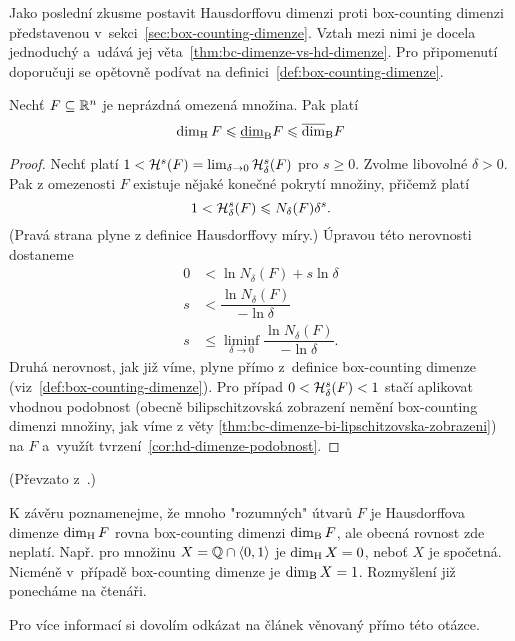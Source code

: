 Jako poslední zkusme postavit Hausdorffovu dimenzi proti box-counting dimenzi představenou v~sekci~\ref{sec:box-counting-dimenze}. Vztah mezi nimi je docela jednoduchý a~udává jej věta~\ref{thm:bc-dimenze-vs-hd-dimenze}. Pro připomenutí doporučuji se opětovně podívat na definici~\ref{def:box-counting-dimenze}.
\begin{theorem}\label{thm:bc-dimenze-vs-hd-dimenze}
    Nechť $F\subseteq\mathbb{R}^n$ je neprázdná omezená množina. Pak platí
    \[\operatorname{dim_H}{F}\leqslant\underline{\dim}_\textup{B}{F}\leqslant\overline{\dim}_\textup{B}{F}\]
\end{theorem}
\begin{proof}
    Nechť platí $1<\mathcal{H}^{s}(F)=\lim_{\delta\to 0}\mathcal{H}_{\delta}^{s}(F)$ pro $s\geqslant 0$. Zvolme libovolné $\delta>0$. Pak z omezenosti $F$ existuje nějaké konečné pokrytí množiny, přičemž platí
    \[1<\mathcal{H}_{\delta}^{s}(F)\leqslant N_\delta(F)\delta^s.\]
    (Pravá strana plyne z definice Hausdorffovy míry.) Úpravou této nerovnosti dostaneme
    \begin{align*}
        0&<\ln{N_\delta(F)}+s\ln{\delta}\\
        s&<\dfrac{\ln{N_\delta(F)}}{-\ln{\delta}}\\
        s&\leqslant\liminf_{\delta\to 0}\dfrac{\ln{N_\delta(F)}}{-\ln{\delta}}.
    \end{align*}
    Druhá nerovnost, jak již víme, plyne přímo z~definice box-counting dimenze (viz~\ref{def:box-counting-dimenze}). Pro případ $0<\mathcal{H}_{\delta}^{s}(F)<1$ stačí aplikovat vhodnou podobnost (obecně bilipschitzovská zobrazení nemění box-counting dimenzi množiny, jak víme z věty \ref{thm:bc-dimenze-bi-lipschitzovska-zobrazeni}) na $F$ a~využít tvrzení~\ref{cor:hd-dimenze-podobnost}.
\end{proof}
(Převzato z~\citep[str. 50]{Falconer2014}.)

K závěru poznamenejme, že mnoho "rozumných" útvarů $F$ je Hausdorffova dimenze $\operatorname{dim_H}{F}$ rovna box-counting dimenzi $\operatorname{dim_B}{F}$, ale obecná rovnost zde neplatí. Např. pro množinu $X=\mathbb{Q}\cap\langle0,1\rangle$ je $\operatorname{dim_H}{X}=0$, neboť $X$ je spočetná. Nicméně v~případě box-counting dimenze je $\operatorname{dim_B}{X}=1$. Rozmyšlení již ponecháme na čtenáři.

Pro více informací si dovolím odkázat na článek \cite{Falconer1989} věnovaný přímo této otázce.